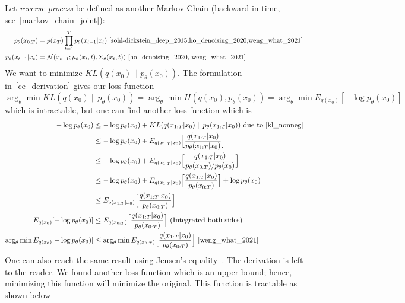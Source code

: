 \documentclass{article}
\numberwithin{equation}{subsection}
\begin{document}
Let \textit{reverse process} be defined as another Markov Chain (backward in time, see~\ref{markov_chain_joint}):
\begin{align}
    p_\theta(x_{0:T}) &= p(x_T)\prod_{t=1}^T p_\theta(x_{t-1}|x_t)~\cite{sohl-dickstein_deep_2015,ho_denoising_2020,weng_what_2021}\\
    p_\theta(x_{t-1}|x_t) &= \mathcal{N}(x_{t-1}; \mu_\theta(x_t, t), \Sigma_\theta(x_t,t))~\cite{ho_denoising_2020, weng_what_2021}
\end{align}
We want to minimize $KL(q(x_0)\parallel p_\theta(x_0))$. The formulation in~\ref{ce_derivation} gives our loss function
\begin{equation}
    \arg_\theta \min KL(q(x_0)\parallel p_\theta(x_0)) = \arg_\theta \min H(q(x_0), p_\theta(x_0)) = \arg_\theta \min E_{q(x_0)}[-\log p_\theta(x_0)]
\end{equation}
which is intractable, but one can find another loss function which is
\begin{align}
-\log p_\theta(x_0) 
&\leq -\log p_\theta(x_0)+KL(q(x_{1:T}|x_0) \parallel p_\theta(x_{1:T}|x_0))\ \text{due to~\ref{kl_nonneg}}\\
&\leq -\log p_\theta(x_0)+E_{q(x_{1:T}|x_0)}\Big[\frac{q(x_{1:T}|x_0)}{p_\theta(x_{1:T}|x_0)}\Big]\\
&\leq -\log p_\theta(x_0)+E_{q(x_{1:T}|x_0)}\Big[\frac{q(x_{1:T}|x_0)}{p_\theta(x_{0:T})/p_\theta(x_0)}\Big]\\
&\leq -\log p_\theta(x_0)+E_{q(x_{1:T}|x_0)}\Big[\frac{q(x_{1:T}|x_0)}{p_\theta(x_{0:T})}\Big]+\log p_\theta(x_0)\\
&\leq E_{q(x_{1:T}|x_0)}\Big[\frac{q(x_{1:T}|x_0)}{p_\theta(x_{0:T})}\Big]\\
E_{q(x_0)}[-\log p_\theta(x_0)] &\leq E_{q(x_{0:T})}\Big[\frac{q(x_{1:T}|x_0)}{p_\theta(x_{0:T})}\Big]\ \text{(Integrated both sides)}\\
\arg_\theta \min E_{q(x_0)}[-\log p_\theta(x_0)] &\leq \arg_\theta \min E_{q(x_{0:T})}\Big[\frac{q(x_{1:T}|x_0)}{p_\theta(x_{0:T})}\Big]~\cite{weng_what_2021}
\end{align}
One can also reach the same result using Jensen's equality~\cite{sohl-dickstein_deep_2015,weng_what_2021}. The derivation is left to the reader. We found another loss function which is an upper bound; hence, minimizing this function will minimize the original. This function is tractable as shown below
\end{document}

